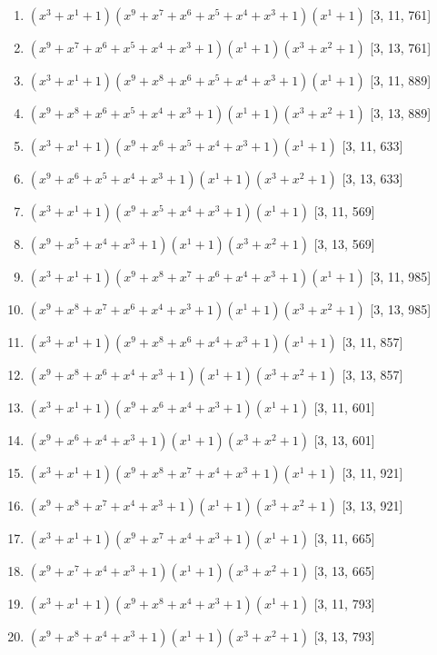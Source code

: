 \documentclass[10pt,twocolumn]{article}
\begin{document}
\begin{enumerate}
\item $(x^{3} + x^{1} + 1)(x^{9} + x^{7} + x^{6} + x^{5} + x^{4} + x^{3} + 1)(x^{1} + 1)$  [3, 11, 761]
\item $(x^{9} + x^{7} + x^{6} + x^{5} + x^{4} + x^{3} + 1)(x^{1} + 1)(x^{3} + x^{2} + 1)$  [3, 13, 761]
\item $(x^{3} + x^{1} + 1)(x^{9} + x^{8} + x^{6} + x^{5} + x^{4} + x^{3} + 1)(x^{1} + 1)$  [3, 11, 889]
\item $(x^{9} + x^{8} + x^{6} + x^{5} + x^{4} + x^{3} + 1)(x^{1} + 1)(x^{3} + x^{2} + 1)$  [3, 13, 889]
\item $(x^{3} + x^{1} + 1)(x^{9} + x^{6} + x^{5} + x^{4} + x^{3} + 1)(x^{1} + 1)$  [3, 11, 633]
\item $(x^{9} + x^{6} + x^{5} + x^{4} + x^{3} + 1)(x^{1} + 1)(x^{3} + x^{2} + 1)$  [3, 13, 633]
\item $(x^{3} + x^{1} + 1)(x^{9} + x^{5} + x^{4} + x^{3} + 1)(x^{1} + 1)$  [3, 11, 569]
\item $(x^{9} + x^{5} + x^{4} + x^{3} + 1)(x^{1} + 1)(x^{3} + x^{2} + 1)$  [3, 13, 569]
\item $(x^{3} + x^{1} + 1)(x^{9} + x^{8} + x^{7} + x^{6} + x^{4} + x^{3} + 1)(x^{1} + 1)$  [3, 11, 985]
\item $(x^{9} + x^{8} + x^{7} + x^{6} + x^{4} + x^{3} + 1)(x^{1} + 1)(x^{3} + x^{2} + 1)$  [3, 13, 985]
\item $(x^{3} + x^{1} + 1)(x^{9} + x^{8} + x^{6} + x^{4} + x^{3} + 1)(x^{1} + 1)$  [3, 11, 857]
\item $(x^{9} + x^{8} + x^{6} + x^{4} + x^{3} + 1)(x^{1} + 1)(x^{3} + x^{2} + 1)$  [3, 13, 857]
\item $(x^{3} + x^{1} + 1)(x^{9} + x^{6} + x^{4} + x^{3} + 1)(x^{1} + 1)$  [3, 11, 601]
\item $(x^{9} + x^{6} + x^{4} + x^{3} + 1)(x^{1} + 1)(x^{3} + x^{2} + 1)$  [3, 13, 601]
\item $(x^{3} + x^{1} + 1)(x^{9} + x^{8} + x^{7} + x^{4} + x^{3} + 1)(x^{1} + 1)$  [3, 11, 921]
\item $(x^{9} + x^{8} + x^{7} + x^{4} + x^{3} + 1)(x^{1} + 1)(x^{3} + x^{2} + 1)$  [3, 13, 921]
\item $(x^{3} + x^{1} + 1)(x^{9} + x^{7} + x^{4} + x^{3} + 1)(x^{1} + 1)$  [3, 11, 665]
\item $(x^{9} + x^{7} + x^{4} + x^{3} + 1)(x^{1} + 1)(x^{3} + x^{2} + 1)$  [3, 13, 665]
\item $(x^{3} + x^{1} + 1)(x^{9} + x^{8} + x^{4} + x^{3} + 1)(x^{1} + 1)$  [3, 11, 793]
\item $(x^{9} + x^{8} + x^{4} + x^{3} + 1)(x^{1} + 1)(x^{3} + x^{2} + 1)$  [3, 13, 793]

\end{enumerate}
\end{document}
